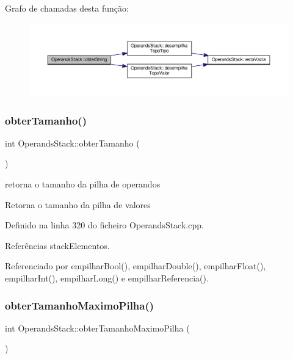 Grafo de chamadas desta função\+:\nopagebreak
\begin{figure}[H]
\begin{center}
\leavevmode
\includegraphics[width=350pt]{classOperandsStack_a32ad6a1ea26c02cf709fed1e86412b4a_cgraph}
\end{center}
\end{figure}
\mbox{\label{classOperandsStack_a6ea316fc2b2503af2175fada4d4a9741}} 
\subsubsection{\texorpdfstring{obter\+Tamanho()}{obterTamanho()}}
{\footnotesize\ttfamily int Operands\+Stack\+::obter\+Tamanho (\begin{DoxyParamCaption}{ }\end{DoxyParamCaption})}



retorna o tamanho da pilha de operandos 

Retorna o tamanho da pilha de valores 

Definido na linha 320 do ficheiro Operands\+Stack.\+cpp.



Referências stack\+Elementos.



Referenciado por empilhar\+Bool(), empilhar\+Double(), empilhar\+Float(), empilhar\+Int(), empilhar\+Long() e empilhar\+Referencia().

\mbox{\label{classOperandsStack_a834d4e49d01388abf37582f95d66b40e}} 
\subsubsection{\texorpdfstring{obter\+Tamanho\+Maximo\+Pilha()}{obterTamanhoMaximoPilha()}}
{\footnotesize\ttfamily int Operands\+Stack\+::obter\+Tamanho\+Maximo\+Pilha (\begin{DoxyParamCaption}{ }\end{DoxyParamCaption})}



